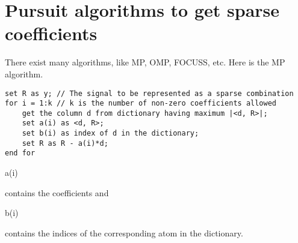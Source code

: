 \documentclass[10pt,a4paper,final]{article}
\begin{document}
\section{Pursuit algorithms to get sparse coefficients}
There exist many algorithms, like MP, OMP, FOCUSS, etc. Here is the MP algorithm.
\begin{verbatim}
set R as y; // The signal to be represented as a sparse combination
for i = 1:k // k is the number of non-zero coefficients allowed
    get the column d from dictionary having maximum |<d, R>|;
    set a(i) as <d, R>;
    set b(i) as index of d in the dictionary;
    set R as R - a(i)*d;
end for
\end{verbatim} 
\begin{texttt}a(i)\end{texttt} contains the coefficients and \begin{texttt}b(i)\end{texttt} contains the indices of the corresponding atom in the dictionary. 
\end{document}
